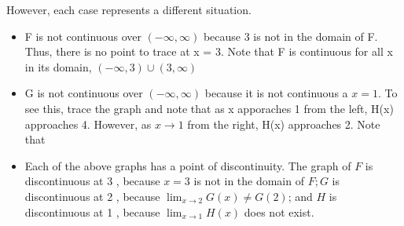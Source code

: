 \documentclass{report}
\begin{document}
\noindent However, each case represents a different situation.

\pagebreak

\hspace{-14mm}\begin{minipage}{0.45\textwidth}
\begin{itemize}
  \item F is not continuous over $(-\infty, \infty)$ because 3 is not in the domain of F. Thus, there is no point to trace at x = 3. Note that F is continuous for all x in its domain, $(-\infty, 3) \cup (3,\infty)$
  \item G is not continuous over $(-\infty,\infty)$ because it is not continuous a $ x=1$. To see this, trace the graph and note that as x apporaches 1 from the left, H(x) approaches 4. However, as $x \to 1$ from the right, H(x) approaches 2. Note that 
  \item Each of the above graphs has a point of discontinuity. The graph of $F$ is discontinuous at 3 , because $x=3$ is not in the domain of $F ; G$ is discontinuous at 2 , because $\lim _{x \rightarrow 2} G(x) \neq G(2)$; and $H$ is discontinuous at 1 , because $\lim _{x \rightarrow 1} H(x)$ does not exist.
\end{itemize}
\end{minipage}
\hspace{8mm}\begin{minipage}{0.6\textwidth}
\end{minipage}
\end{document}
